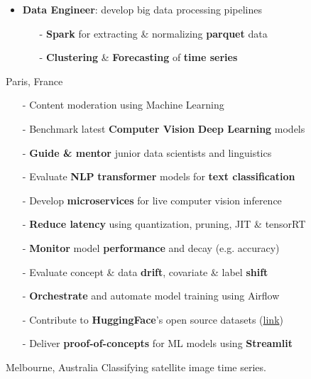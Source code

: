 \documentclass[10pt,a4paper,ragged2e]{altacv}
\begin{document}
\begin{itemize}
	\item \textbf{Data Engineer}: develop big data processing pipelines 
	\vspace{0.3em}
	\begin{itemize}
		\item[-] \textbf{Spark} for extracting \& normalizing \textbf{parquet} data
		\item[-] \textbf{Clustering} \& \textbf{Forecasting} of \textbf{time series} 
	\end{itemize}
	
\end{itemize}

\divider

     {Paris, France}
\begin{itemize}
	\item[-]  Content moderation using Machine Learning
	\item[-] Benchmark latest \textbf{Computer Vision} \textbf{Deep Learning} models
	\item[-] \textbf{Guide \& mentor} junior data scientists and linguistics
	\item[-] Evaluate \textbf{NLP} \textbf{transformer} models for \textbf{text classification}  
	\item[-] Develop \textbf{microservices} for live computer vision inference 
	\item[-] \textbf{Reduce latency} using quantization, pruning, JIT \& tensorRT
	\item[-] \textbf{Monitor} model \textbf{performance} and decay (e.g. accuracy)
	\item[-] Evaluate concept \& data \textbf{drift}, covariate \& label \textbf{shift}
	\item[-] \textbf{Orchestrate} and automate model training using Airflow 
	\item[-] Contribute to \textbf{HuggingFace}'s open source datasets (\href{https://github.com/pulls?q=is%3Apr+author%3Ahfawaz+archived%3Afalse+is%3Aclosed+huggingface+is%3Amerged}{link})
	\item[-] Deliver \textbf{proof-of-concepts} for ML models using \textbf{Streamlit}
\end{itemize}

\divider


     {Melbourne, Australia}
{Classifying satellite image time series.}\\
\divider
\end{document}
